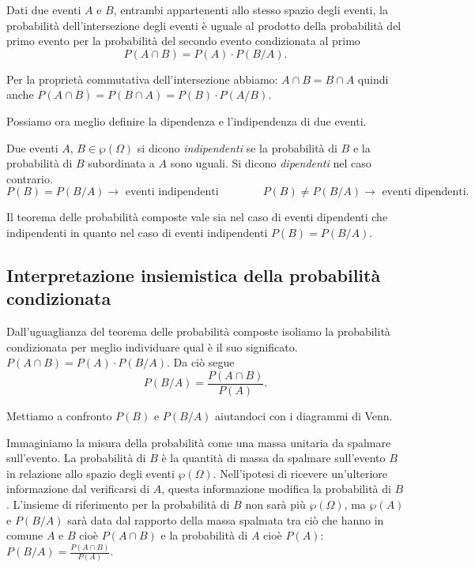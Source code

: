 \begin{teorema}
Dati due eventi $A$ e $B$, entrambi appartenenti allo stesso spazio degli eventi, la probabilità dell'intersezione degli eventi è uguale al prodotto della probabilità del primo evento per la probabilità del secondo evento condizionata al primo
\[P(A\cap B)=P(A)\cdot P(B/A).\]
\end{teorema}

Per la proprietà commutativa dell'intersezione abbiamo: $A\cap B=B\cap A$ quindi anche $P(A\cap B)=P(B\cap A)=P(B)\cdot P(A/B)$.

Possiamo ora meglio definire la dipendenza e l'indipendenza di due eventi.

\begin{definizione}
Due eventi $A$, $B\in \wp(\Omega)$ si dicono \emph{indipendenti} se la probabilità di $B$ e la probabilità di $B$ subordinata a $A$ sono uguali. Si dicono \emph{dipendenti} nel caso contrario.
\[P(B)=P(B/A)\to \text{ eventi indipendenti}\qquad\qquad
{P}(B)\neq P(B/A)\to \text{ eventi dipendenti.}\]
\end{definizione}

\osservazione Il teorema delle probabilità composte vale sia nel caso di eventi dipendenti che indipendenti in quanto nel caso di eventi indipendenti $P(B)=P(B/A)$.

\subsection{Interpretazione insiemistica della probabilità condizionata}

Dall'uguaglianza del teorema delle probabilità composte isoliamo la probabilità condizionata per meglio individuare qual è il suo significato. $P(A\cap B)=P(A)\cdot P(B/A)$. Da ciò segue 
\[P(B/A)=\frac{P(A\cap B)}{P(A)}.\]

Mettiamo a confronto $P(B)$ e $P(B/A)$ aiutandoci con i diagrammi di Venn.
\begin{center}
 
\end{center}
Immaginiamo la misura della probabilità come una massa unitaria da spalmare sull'evento. La probabilità di $B$ è la quantità di massa da spalmare sull'evento $B$ in relazione allo spazio degli eventi $\wp(\Omega)$. Nell'ipotesi di ricevere un'ulteriore informazione dal verificarsi di $A$, questa informazione modifica la probabilità di $B$. L'insieme di riferimento per la probabilità di $B$ non sarà più $\wp(\Omega)$, ma $\wp(A)$ e $P(B/A)$ sarà data dal rapporto della massa spalmata tra ciò che hanno in comune $A$ e $B$ cioè $P(A\cap B)$ e la probabilità di $A$ cioè $P(A)$: $P(B/A)=\frac{P(A\cap B)}{P(A)}$.

